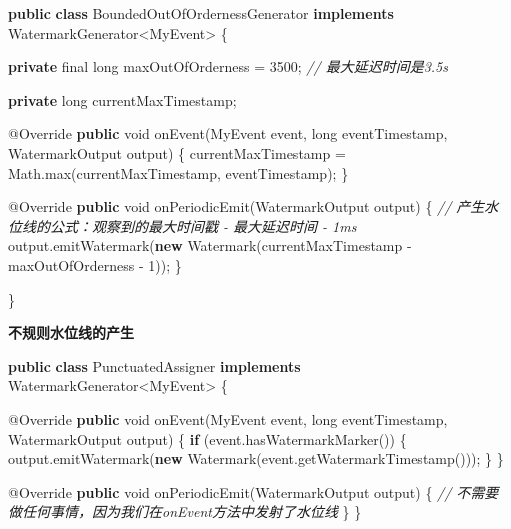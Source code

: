 \documentclass[cn,11pt,chinese]{elegantbook}
\newenvironment{Shaded}{}{}
\newcommand{\AttributeTok}[1]{\textcolor[rgb]{0.49,0.56,0.16}{#1}}
\newcommand{\BuiltInTok}[1]{#1}
\newcommand{\CommentTok}[1]{\textcolor[rgb]{0.38,0.63,0.69}{\textit{#1}}}
\newcommand{\DataTypeTok}[1]{\textcolor[rgb]{0.56,0.13,0.00}{#1}}
\newcommand{\DecValTok}[1]{\textcolor[rgb]{0.25,0.63,0.44}{#1}}
\newcommand{\FunctionTok}[1]{\textcolor[rgb]{0.02,0.16,0.49}{#1}}
\newcommand{\KeywordTok}[1]{\textcolor[rgb]{0.00,0.44,0.13}{\textbf{#1}}}
\newcommand{\NormalTok}[1]{#1}
\begin{document}
\begin{Shaded}
\begin{Highlighting}[]
\KeywordTok{public} \KeywordTok{class}\NormalTok{ BoundedOutOfOrdernessGenerator }\KeywordTok{implements}\NormalTok{ WatermarkGenerator\textless{}MyEvent\textgreater{} \{}

    \KeywordTok{private} \DataTypeTok{final} \DataTypeTok{long}\NormalTok{ maxOutOfOrderness = }\DecValTok{3500}\NormalTok{; }\CommentTok{// 最大延迟时间是3.5s}

    \KeywordTok{private} \DataTypeTok{long}\NormalTok{ currentMaxTimestamp;}

    \AttributeTok{@Override}
    \KeywordTok{public} \DataTypeTok{void} \FunctionTok{onEvent}\NormalTok{(MyEvent event, }\DataTypeTok{long}\NormalTok{ eventTimestamp, WatermarkOutput output) \{}
\NormalTok{        currentMaxTimestamp = }\BuiltInTok{Math}\NormalTok{.}\FunctionTok{max}\NormalTok{(currentMaxTimestamp, eventTimestamp);}
\NormalTok{    \}}

    \AttributeTok{@Override}
    \KeywordTok{public} \DataTypeTok{void} \FunctionTok{onPeriodicEmit}\NormalTok{(WatermarkOutput output) \{}
        \CommentTok{// 产生水位线的公式：观察到的最大时间戳 {-} 最大延迟时间 {-} 1ms}
\NormalTok{        output.}\FunctionTok{emitWatermark}\NormalTok{(}\KeywordTok{new} \FunctionTok{Watermark}\NormalTok{(currentMaxTimestamp {-} maxOutOfOrderness {-} }\DecValTok{1}\NormalTok{));}
\NormalTok{    \}}

\NormalTok{\}}
\end{Highlighting}
\end{Shaded}

\textbf{不规则水位线的产生}

\begin{Shaded}
\begin{Highlighting}[]
\KeywordTok{public} \KeywordTok{class}\NormalTok{ PunctuatedAssigner }\KeywordTok{implements}\NormalTok{ WatermarkGenerator\textless{}MyEvent\textgreater{} \{}

    \AttributeTok{@Override}
    \KeywordTok{public} \DataTypeTok{void} \FunctionTok{onEvent}\NormalTok{(MyEvent event, }\DataTypeTok{long}\NormalTok{ eventTimestamp, WatermarkOutput output) \{}
        \KeywordTok{if}\NormalTok{ (event.}\FunctionTok{hasWatermarkMarker}\NormalTok{()) \{}
\NormalTok{            output.}\FunctionTok{emitWatermark}\NormalTok{(}\KeywordTok{new} \FunctionTok{Watermark}\NormalTok{(event.}\FunctionTok{getWatermarkTimestamp}\NormalTok{()));}
\NormalTok{        \}}
\NormalTok{    \}}

    \AttributeTok{@Override}
    \KeywordTok{public} \DataTypeTok{void} \FunctionTok{onPeriodicEmit}\NormalTok{(WatermarkOutput output) \{}
        \CommentTok{// 不需要做任何事情，因为我们在onEvent方法中发射了水位线}
\NormalTok{    \}}
\NormalTok{\}}
\end{Highlighting}
\end{Shaded}
\end{document}
